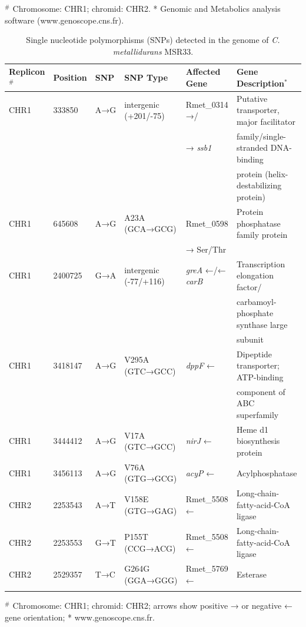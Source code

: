 \begin{table}
{\begin{tabular*}{\columnwidth}{@{}llllllll@{}}
\\
\hline
\hline
\end{tabular*}
} {\footnotesize{$^\#$ Chromosome: CHR1; chromid: CHR2. * Genomic and Metabolics analysis software (www.genoscope.cns.fr).} }
\end{table}

\begin{table}
\caption{ Single nucleotide polymorphisms (SNPs) detected in the genome of \textit{C. metallidurans} MSR33.\\}
\label{table:43}%
{%
\begin{tabular*}{\columnwidth}{@{}llllll@{}}
\hline
\textbf{Replicon$^\#$} & \textbf{Position} & \textbf{SNP} & \textbf{SNP Type} & \textbf{Affected Gene} & \textbf{Gene Description$^*$} \\
\hline
CHR1 &	333850 & A→G & intergenic (+201/-75) &	Rmet\_0314 →/	& Putative transporter, major facilitator \\
 &	 &  &  & → \textit{ssb1}	& family/single-stranded DNA-binding \\
 &	 &  &  &	& protein (helix-destabilizing protein) \\
CHR1 &	645608	& A→G & A23A (GCA→GCG) &	Rmet\_0598  & Protein phosphatase family protein \\
 &	 &  &  & →	Ser/Thr	& \\
CHR1 &	2400725	& G→A	& intergenic (-77/+116) &	\textit{greA} ←/← \textit{carB} &	Transcription elongation factor/\\
&	 &  &  &	& carbamoyl-phosphate synthase large  \\
&	 &  &  &	& subunit  \\
CHR1 &	3418147	& A→G &	V295A (GTC→GCC) &	\textit{dppF} ←	& Dipeptide transporter; ATP-binding  \\
&	 &  &  &	& component of ABC superfamily \\
CHR1 &	3444412	& A→G &	V17A (GTC→GCC) &	\textit{nirJ} ← &	Heme d1 biosynthesis protein \\
CHR1 &	3456113 & A→G &	V76A (GTG→GCG) &	\textit{acyP} ← &	Acylphosphatase \\
CHR2 &	2253543 & A→T	& V158E (GTG→GAG) &	Rmet\_5508 ← &	Long-chain-fatty-acid-CoA ligase \\
CHR2 &	2253553 &	G→T	& P155T (CCG→ACG) &	Rmet\_5508 ← &	Long-chain-fatty-acid-CoA ligase \\
CHR2 &	2529357	& T→C &	G264G (GGA→GGG) & 	Rmet\_5769 ← & Esterase \\

\\
\hline
\hline
\end{tabular*}
} {\footnotesize{$^\#$ Chromosome: CHR1; chromid: CHR2; arrows show positive → or negative ← gene orientation; * www.genoscope.cns.fr.} }
\end{table}
